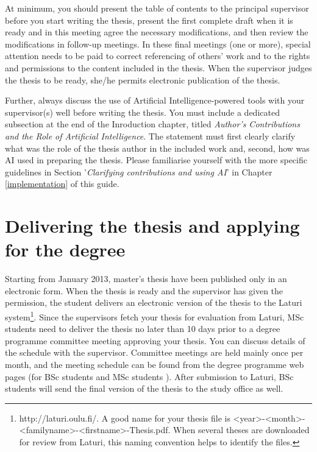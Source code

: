 At minimum, you should present the table of contents to the principal supervisor before you start writing the thesis, present the first complete draft when it is ready and in this meeting agree the necessary modifications, and then review the modifications in follow-up meetings. In these final meetings (one or more), special attention needs to be paid to correct referencing of others’ work and to the rights and permissions to the content included in the thesis. When the supervisor judges the thesis to be ready, she/he permits electronic publication of the thesis.

Further, always discuss the use of Artificial Intelligence-powered tools with your supervisor(s) well before writing the thesis. You must include a dedicated subsection at the end of the Inroduction chapter, titled \textit{Author's Contributions and the Role of Artificial Intelligence}. The statement must first clearly clarify what was the role of the thesis author in the included work and, second, how was AI used in preparing the thesis. Please familiarise yourself with the more specific guidelines in Section '\textit{Clarifying contributions and using AI}' in Chapter \ref{implementation} of this guide.

\section{Delivering the thesis and applying for the degree}

Starting from January 2013, master’s thesis have been published only in an electronic form. When the thesis is ready and the supervisor has given the permission, the student delivers an electronic version of the thesis to the Laturi system\footnote{http://laturi.oulu.fi/. A good name for your thesis file is <year>-<month>-<familyname>-<firstname>-Thesis.pdf. When several theses are downloaded for review from Laturi, this naming convention helps to identify the files.}. Since the supervisors fetch your thesis for evaluation from Laturi, MSc students need to deliver the thesis no later than 10 days prior to a degree programme committee meeting approving your thesis. You can discuss details of the schedule with the supervisor. Committee meetings are held mainly once per month, and the meeting schedule can be found from the degree programme web pages (for BSc students \cite{bscstudies} and MSc students \cite{mscstudies}). After submission to Laturi, BSc students will send the final version of the thesis to the study office as well.

